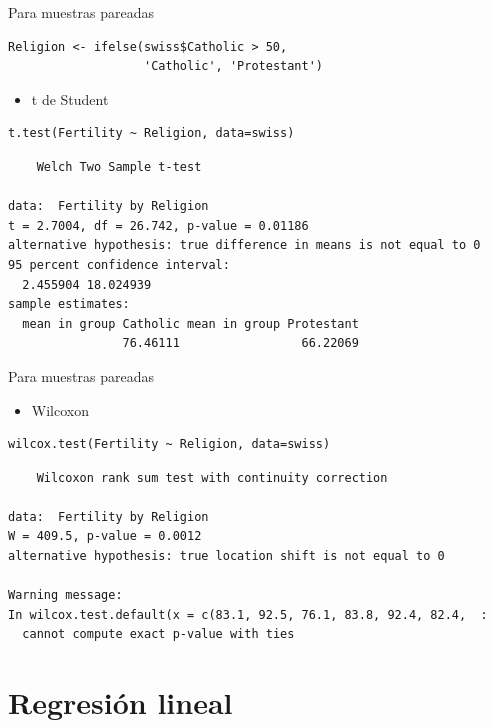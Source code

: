 \documentclass[xcolor={usenames,svgnames,dvipsnames}]{beamer}
\begin{document}
\begin{frame}[fragile,label=sec-4-2]{Para muestras pareadas}
 \lstset{language=R,label= ,caption= ,numbers=none}
\begin{lstlisting}
Religion <- ifelse(swiss$Catholic > 50,
                   'Catholic', 'Protestant')
\end{lstlisting}

\begin{itemize}
\item t de Student
\end{itemize}
\lstset{language=R,label= ,caption= ,numbers=none}
\begin{lstlisting}
t.test(Fertility ~ Religion, data=swiss)
\end{lstlisting}

\begin{verbatim}
	Welch Two Sample t-test

data:  Fertility by Religion
t = 2.7004, df = 26.742, p-value = 0.01186
alternative hypothesis: true difference in means is not equal to 0
95 percent confidence interval:
  2.455904 18.024939
sample estimates:
  mean in group Catholic mean in group Protestant 
                76.46111                 66.22069
\end{verbatim}
\end{frame}

\begin{frame}[fragile,label=sec-4-3]{Para muestras pareadas}
 \begin{itemize}
\item Wilcoxon
\end{itemize}
\lstset{language=R,label= ,caption= ,numbers=none}
\begin{lstlisting}
wilcox.test(Fertility ~ Religion, data=swiss)
\end{lstlisting}

\begin{verbatim}
	Wilcoxon rank sum test with continuity correction

data:  Fertility by Religion
W = 409.5, p-value = 0.0012
alternative hypothesis: true location shift is not equal to 0

Warning message:
In wilcox.test.default(x = c(83.1, 92.5, 76.1, 83.8, 92.4, 82.4,  :
  cannot compute exact p-value with ties
\end{verbatim}
\end{frame}

\section{Regresión lineal}
\label{sec-5}
\end{document}
